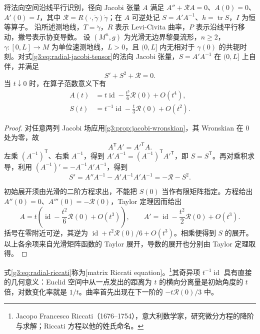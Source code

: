 \begin{proposition}\label{g3:prop:radial-riccati}
	将法向空间沿线平行识别，径向 Jacobi 张量 \(A\) 满足 \(A''+\mathcal RA=0\)、\(A(0)=0\)、\(A'(0)=I\)，其中 \(\mathcal R=R(\cdot,\dot\gamma)\dot\gamma\)；在 \(A\) 可逆处记 \(S=A'A^{-1}\)、\(h=\operatorname{tr}S\)，\(I\) 为恒等算子。
	沿所述测地线，\(T=\dot\gamma\)，\(R\) 表示 Levi-Civita 曲率，\(P\) 表示沿线平行移动，撇号表示协变导数。
	设 \((M^n,g)\) 为光滑无边界黎曼流形，\(n\ge2\)，\(\gamma:[0,L]\to M\) 为单位速测地线，\(L>0\)，且 \((0,L]\) 内无相对于 \(\gamma(0)\) 的共轭时刻。对式\eqref{g3:eq:radial-jacobi-tensor}的法向 Jacobi 张量，\(S=A'A^{-1}\) 在 \((0,L]\) 上自伴，并满足
	\begin{equation}\label{g3:eq:radial-riccati}
		S'+S^2+\mathcal R=0.
	\end{equation}
	当 \(t\downarrow0\) 时，在算子范数意义下有
	\begin{equation}\label{g3:eq:radial-riccati-initial}
		\begin{aligned}
		A(t)&=t\operatorname{id}-\frac{t^3}{6}\mathcal R(0)+O(t^4),\\
		S(t)&=t^{-1}\operatorname{id}-\frac t3\mathcal R(0)+O(t^2).
		\end{aligned}
	\end{equation}
\end{proposition}
\begin{proof}
	对任意两列 Jacobi 场应用\cref{g3:prop:jacobi-wronskian}，其 Wronskian 在 \(0\) 处为零，故
	\[
		A^{\mathsf T}A'=A'^{\mathsf T}A.
	\]
	左乘 \((A^{-1})^{\mathsf T}\)、右乘 \(A^{-1}\)，得到
	\(A'A^{-1}=(A^{-1})^{\mathsf T}A'^{\mathsf T}\)，即 \(S=S^{\mathsf T}\)。再对乘积求导，利用 \((A^{-1})'=-A^{-1}A'A^{-1}\)，得到
	\[
		S'=A''A^{-1}-A'A^{-1}A'A^{-1}=-\mathcal R-S^2.
	\]

	初始展开须由光滑的二阶方程求出，不能把 \(S(0)\) 当作有限矩阵指定。方程给出 \(A''(0)=0\)、\(A'''(0)=-\mathcal R(0)\)，Taylor 定理因而给出
	\[
		A=t\left(\operatorname{id}-\frac{t^2}{6}\mathcal R(0)+O(t^3)\right),
		\qquad A'=\operatorname{id}-\frac{t^2}{2}\mathcal R(0)+O(t^3).
	\]
	括号在零附近可逆，其逆为 \(\operatorname{id}+t^2\mathcal R(0)/6+O(t^3)\)。相乘便得到 \(S\) 的展开。以上各余项来自光滑矩阵函数的 Taylor 展开，导数的展开也分别由 Taylor 定理取得。
\end{proof}

式\eqref{g3:eq:radial-riccati}称为[matrix Riccati equation]。\footnote{Jacopo Francesco Riccati（1676--1754），意大利数学家，研究微分方程的降阶与求解；Riccati 方程以他的姓氏命名。}其奇异项 \(t^{-1}\operatorname{id}\) 具有直接的几何意义：Euclid 空间中从一点发出的距离为 \(t\) 的横向分离量是初始角度的 \(t\) 倍，对数变化率就是 \(1/t\)。曲率首先出现在下一阶的 \(-t\mathcal R(0)/3\) 中。

